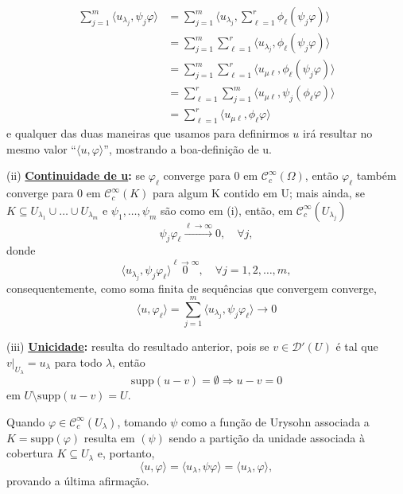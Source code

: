 \documentclass[../distribution_theory_notes.tex]{subfiles}
\begin{document}
\begin{proof*}
\begin{align*}
		\sum\limits_{j=1}^{m}\langle u_{\lambda_{j}}, \psi_{j}\varphi  \rangle & =\sum\limits_{j=1}^{m}\biggl\langle u_{\lambda_{j}}, \sum\limits_{\ell =1}^{r} \phi_{\ell }(\psi_{j}\varphi ) \biggr\rangle \\
		                                                                       & =\sum\limits_{j=1}^{m}\sum\limits_{\ell =1}^{r}\langle u_{\lambda_{j}}, \phi_{\ell}(\psi_{j}\varphi ) \rangle               \\
		                                                                       & =\sum\limits_{j=1}^{m}\sum\limits_{\ell =1}^{r}\langle u_{\mu \ell }, \phi_{\ell}(\psi_{j}\varphi ) \rangle                 \\
		                                                                       & = \sum\limits_{\ell =1}^{r}\sum\limits_{j=1}^{m}\langle u_{\mu \ell }, \psi_{j}(\phi_{\ell}\varphi ) \rangle                \\
		                                                                       & = \sum\limits_{\ell =1}^{r}\langle u_{\mu \ell }, \phi_{\ell}\varphi \rangle
	\end{align*}
	e qualquer das duas maneiras que usamos para definirmos \(u\) irá resultar no mesmo valor ``\(\langle u, \varphi  \rangle\)'', mostrando a boa-definição de u.

	(ii) \textbf{\underline{Continuidade de u}:} se \(\varphi_{\ell}\) converge para 0 em \(\mathcal{C}_{c}^{\infty}(\Omega )\), então \(\varphi_{\ell}\) também converge para 0 em \(\mathcal{C}_{c}^{\infty}(K)\) para algum K contido em U; mais ainda, se \(K\subseteq U_{\lambda_1}\cup \dotsc \cup U_{\lambda_{m}}\) e \(\psi_1, \dotsc , \psi_{m}\) são como em (i), então, em \(\mathcal{C}_{c}^{\infty}(U_{\lambda_{j}})\)
	\[
		\psi_{j}\varphi_{\ell}\stackrel{\ell \to \infty}\longrightarrow 0, \quad \forall j,
	\]
	donde
	\[
		\langle u_{\lambda_{j}}, \psi_{j}\varphi_{\ell} \rangle\stackrel{\ell \to \infty} 0, \quad \forall j=1, 2, \dotsc , m,
	\]
	consequentemente, como soma finita de sequências que convergem converge,
	\[
		\langle u, \varphi_{\ell} \rangle = \sum\limits_{j=1}^{m}\langle u_{\lambda_{j}}, \psi_{j}\varphi_{\ell} \rangle\to 0
	\]

	(iii) \textbf{\underline{Unicidade}:} resulta do resultado anterior, pois se \(v\in \mathcal{D}'(U)\) é tal que \(v|_{U_{\lambda }}=u_{\lambda }\) para todo \(\lambda \), então
	\[
		\mathrm{supp}(u-v) = \emptyset \Rightarrow u-v=0
	\]
	em \(U\setminus{\mathrm{supp}(u-v)} = U\).

	Quando \(\varphi \in \mathcal{C}_{c}^{\infty}(U_{\lambda })\), tomando \(\psi \) como a função de Urysohn associada a \(K=\mathrm{supp}(\varphi)\) resulta em \((\psi )\) sendo a partição da unidade associada à cobertura \(K\subseteq U_{\lambda }\) e, portanto,
	\[
		\langle u, \varphi  \rangle = \langle u_{\lambda }, \psi \varphi  \rangle=\langle u_{\lambda }, \varphi  \rangle,
	\]
	provando a última afirmação. \qedsymbol
\end{proof*}
\end{document}
